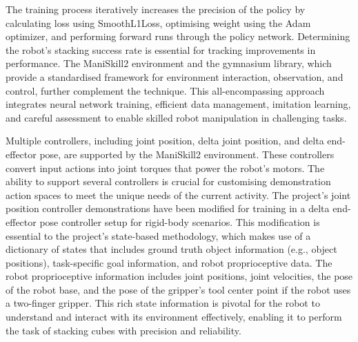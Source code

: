 \documentclass[../report.tex]{subfiles}
\begin{document}
    The training process iteratively increases the precision of the policy by calculating loss using SmoothL1Loss, optimising weight using the Adam optimizer, and performing forward runs through the policy network. Determining the robot's stacking success rate is essential for tracking improvements in performance. The ManiSkill2 environment and the gymnasium library, which provide a standardised framework for environment interaction, observation, and control, further complement the technique. This all-encompassing approach integrates neural network training, efficient data management, imitation learning, and careful assessment to enable skilled robot manipulation in challenging tasks.
    
    Multiple controllers, including joint position, delta joint position, and delta end-effector pose, are supported by the ManiSkill2 environment. These controllers convert input actions into joint torques that power the robot's motors. The ability to support several controllers is crucial for customising demonstration action spaces to meet the unique needs of the current activity. The project's joint position controller demonstrations have been modified for training in a delta end-effector pose controller setup for rigid-body scenarios. This modification is essential to the project's state-based methodology, which makes use of a dictionary of states that includes ground truth object information (e.g., object positions), task-specific goal information, and robot proprioceptive data. The robot proprioceptive information includes joint positions, joint velocities, the pose of the robot base, and the pose of the gripper's tool center point if the robot uses a two-finger gripper. This rich state information is pivotal for the robot to understand and interact with its environment effectively, enabling it to perform the task of stacking cubes with precision and reliability.
\end{document}
